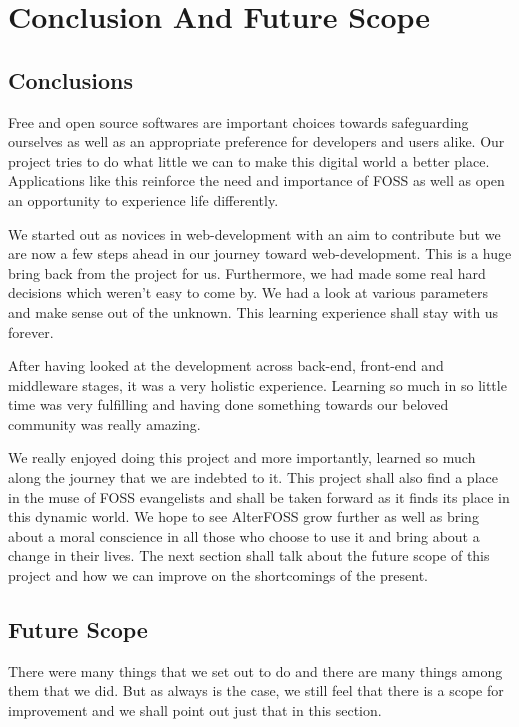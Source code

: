 \chapter{Conclusion And Future Scope}

\section{Conclusions}

Free and open source softwares are important choices towards safeguarding ourselves as well as an appropriate preference for developers and users alike. Our project tries to do what little we can to make this digital world a better place. Applications like this reinforce the need and importance of FOSS as well as open an opportunity to experience life differently. 

We started out as novices in web-development with an aim to contribute but we are now a few steps ahead in our journey toward web-development. This is a huge bring back from the project for us. Furthermore, we had made some real hard decisions which weren't easy to come by. We had a look at various parameters and make sense out of the unknown. This learning experience shall stay with us forever.

After having looked at the development across back-end, front-end and middleware stages, it was a very holistic experience. Learning so much in so little time was very fulfilling and having done something towards our beloved community was really amazing.

We really enjoyed doing this project and more importantly, learned so much along the journey that we are indebted to it. This project shall also find a place in the muse of FOSS evangelists and shall be taken forward as it finds its place in this dynamic world. We hope to see AlterFOSS grow further as well as bring about a moral conscience in all those who choose to use it and bring about a change in their lives. The next section shall talk about the future scope of this project and how we can improve on the shortcomings of the present.

\section{Future Scope}
There were many things that we set out to do and there are many things among them that we did. But as always is the case, we still feel that there is a scope for improvement and we shall point out just that in this section.

